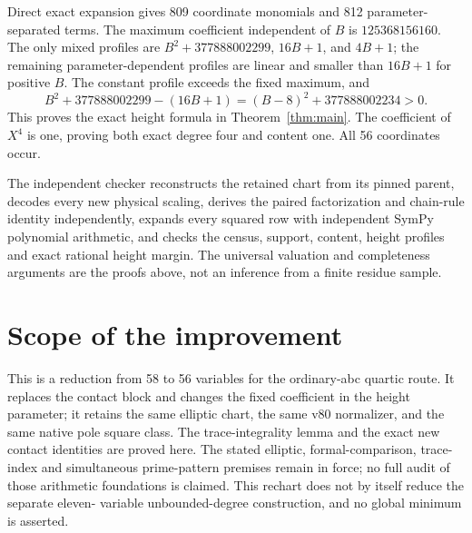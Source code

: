 \documentclass[11pt,a4paper]{article}
\begin{document}
Direct exact expansion gives 809 coordinate monomials and 812
parameter-separated terms. The maximum coefficient independent of $B$
is $125368156160$. The only mixed profiles are
$B^2+377888002299$, $16B+1$, and $4B+1$; the remaining parameter-dependent
profiles are linear and smaller than $16B+1$ for positive $B$.
The constant profile exceeds the fixed maximum, and
\[
 B^2+377888002299-(16B+1)=(B-8)^2+377888002234>0.
\]
This proves the exact height formula in Theorem~\ref{thm:main}.
The coefficient of $X^4$ is one, proving both exact degree four and
content one. All 56 coordinates occur.

The independent checker reconstructs the retained chart from its pinned
parent, decodes every new physical scaling, derives the paired factorization and chain-rule
identity independently, expands every squared row with independent
SymPy polynomial arithmetic, and checks the census, support, content,
height profiles and exact rational height margin. The universal
valuation and completeness arguments are the proofs above, not an
inference from a finite residue sample.

\section{Scope of the improvement}

This is a reduction from 58 to 56 variables for the ordinary-abc quartic
route. It replaces the contact block and changes the fixed coefficient
in the height parameter; it retains the same elliptic chart, the same
v80 normalizer, and the same native pole square class. The trace-integrality
lemma and the exact new contact identities are proved here. The stated
elliptic, formal-comparison, trace-index and simultaneous prime-pattern
premises remain in force; no full audit of those arithmetic foundations
is claimed. This rechart does not by itself reduce the separate eleven-
variable unbounded-degree construction, and no global minimum is asserted.
\end{document}
